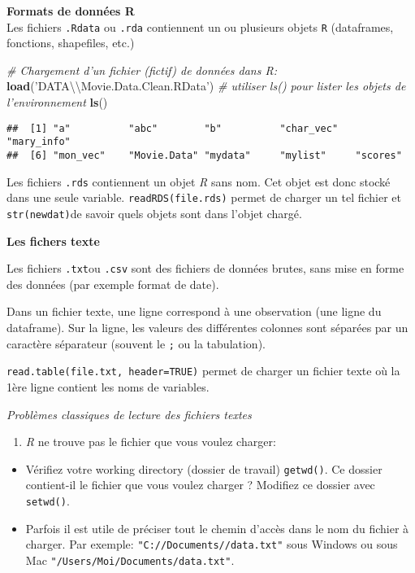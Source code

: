 \documentclass[]{book}
\newenvironment{Shaded}{\begin{snugshade}}{\end{snugshade}}
\newcommand{\CharTok}[1]{\textcolor[rgb]{0.31,0.60,0.02}{#1}}
\newcommand{\CommentTok}[1]{\textcolor[rgb]{0.56,0.35,0.01}{\textit{#1}}}
\newcommand{\KeywordTok}[1]{\textcolor[rgb]{0.13,0.29,0.53}{\textbf{#1}}}
\newcommand{\NormalTok}[1]{#1}
\newcommand{\StringTok}[1]{\textcolor[rgb]{0.31,0.60,0.02}{#1}}
\providecommand{\tightlist}{%
  \setlength{\itemsep}{0pt}\setlength{\parskip}{0pt}}
\begin{document}
\textbf{Formats de données R}\\
Les fichiers \texttt{.Rdata} ou \texttt{.rda} contiennent un ou plusieurs objets \texttt{R} (dataframes, fonctions, shapefiles, etc.)

\begin{Shaded}
\begin{Highlighting}[]
\CommentTok{# Chargement d'un fichier (fictif) de données dans R: }
\KeywordTok{load}\NormalTok{(}\StringTok{'DATA}\CharTok{\textbackslash{}\textbackslash{}}\StringTok{Movie.Data.Clean.RData'}\NormalTok{)}
\CommentTok{# utiliser ls() pour lister les objets de l'environnement}
\KeywordTok{ls}\NormalTok{()}
\end{Highlighting}
\end{Shaded}

\begin{verbatim}
##  [1] "a"          "abc"        "b"          "char_vec"   "mary_info" 
##  [6] "mon_vec"    "Movie.Data" "mydata"     "mylist"     "scores"
\end{verbatim}

Les fichiers \texttt{.rds} contiennent un objet \emph{R} sans nom. Cet objet est donc stocké dans une seule variable. \texttt{readRDS(\textquotesingle{}file.rds\textquotesingle{})} permet de charger un tel fichier et \texttt{str(newdat)}de savoir quels objets sont dans l'objet chargé.

\textbf{Les fichers texte}

Les fichiers \texttt{.txt}ou \texttt{.csv} sont des fichiers de données brutes, sans mise en forme des données (par exemple format de date).

Dans un fichier texte, une ligne correspond à une observation (une ligne du dataframe). Sur la ligne, les valeurs des différentes colonnes sont séparées par un caractère séparateur (souvent le \texttt{;} ou la tabulation).

\texttt{read.table(\textquotesingle{}file.txt\textquotesingle{},\ header=TRUE)} permet de charger un fichier texte où la 1ère ligne contient les noms de variables.

\emph{Problèmes classiques de lecture des fichiers textes}

\begin{enumerate}
\def\labelenumi{\arabic{enumi}.}
\tightlist
\item
  \emph{R} ne trouve pas le fichier que vous voulez charger:
\end{enumerate}

\begin{itemize}
\tightlist
\item
  Vérifiez votre working directory (dossier de travail) \texttt{getwd()}. Ce dossier contient-il le fichier que vous voulez charger ? Modifiez ce dossier avec \texttt{setwd()}.\\
\item
  Parfois il est utile de préciser tout le chemin d'accès dans le nom du fichier à charger. Par exemple: \texttt{"C://Documents//data.txt"} sous Windows ou sous Mac \texttt{"/Users/Moi/Documents/data.txt"}.
\end{itemize}
\end{document}
